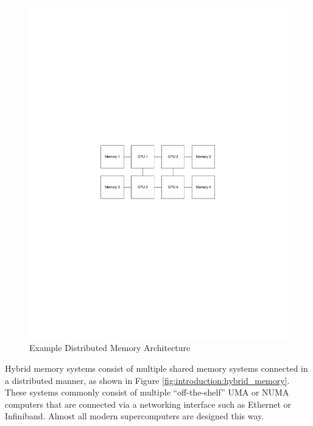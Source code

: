 \begin{figure}[ptb]
	\begin{centering}
		\includegraphics{Introduction/Figures/introduction-distributed_memory.pdf}
		\caption{Example Distributed Memory Architecture}
		\label{fig:introduction:distributed_memory}
	\end{centering}
\end{figure}

Hybrid memory systems consist of multiple shared memory systems connected in a distributed manner, as shown in Figure \ref{fig:introduction:hybrid_memory}. These systems commonly consist of multiple ``off-the-shelf'' UMA or NUMA computers that are connected via a networking interface such as Ethernet or Infiniband. Almost all modern supercomputers are designed this way. \cite{ref:2009-barney-introduction_to_parallel_computing}

